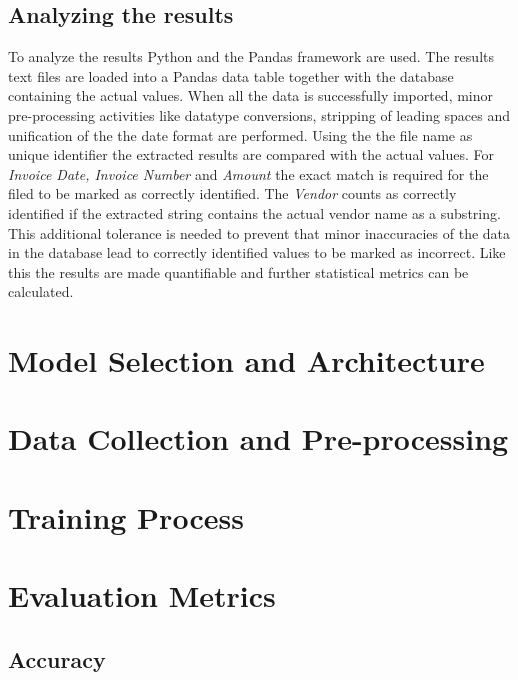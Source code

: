 \subsection{Analyzing the results}
To analyze the results Python and the Pandas framework are used. The results text files are loaded into a Pandas data table together with the database
containing the actual values. When all the data is successfully imported, minor pre-processing activities like datatype conversions, stripping of leading spaces
and unification of the the date format are performed.
Using the the file name as unique identifier the extracted results are compared with the actual values. For \textit{Invoice Date, Invoice Number}
and \textit{Amount} the exact match is required for the filed to be marked as correctly identified. 
The \textit{Vendor} counts as correctly identified if the extracted string contains the actual vendor name as a substring. This additional 
tolerance is needed to prevent that minor inaccuracies of the data in the database lead to correctly identified values to be marked as incorrect.
Like this the results are made quantifiable and further statistical metrics can be calculated.
\section{Model Selection and Architecture}
\section{Data Collection and Pre-processing}
\section{Training Process}
\section{Evaluation Metrics}
\subsection{Accuracy}
